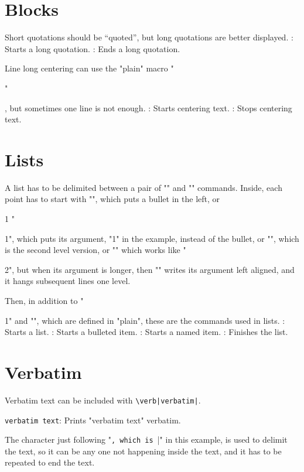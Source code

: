 \section{Blocks}

Short quotations should be “quoted”,
but long quotations are better displayed.
\command\begincitation: Starts a long quotation.
\command\endcitation: Ends a long quotation.

Line long centering can use the
"plain" macro "\centerline",
but sometimes one line is not enough.
\command\begincenter: Starts centering text.
\command\endcenter: Stops centering text.


\section{Lists}

A list has to be delimited between a pair of
"\beginpoints" and "\endpoints" commands.
Inside, each point has to start with
\beginpoints
\point "\point", which puts a bullet in the left, or
 \item{1} "\item{1}", which puts its argument, "1" in the example,
 instead of the bullet, or
  "", which is the second level
 version, or
\point[2] "\point[2]" which works like "\item{2}", but
 when its argument is longer, then
 "" writes its
 argument left aligned, and it hangs subsequent lines
 one level.
\endpoints

Then, in addition to "\item{1}" and "",
which are defined in "plain",
these are the commands used in lists.
\command\beginpoints: Starts a list.
\command\point: Starts a bulleted item.
\command\point[Title]: Starts a named item.
\command\endpoints: Finishes the list.


\section{Verbatim}

Verbatim text can be included with \verb!\verb|verbatim|!.

\command\verb|verbatim text|: Prints "verbatim text" verbatim.

The character just following "\verb", which is "|" in this example,
is used to delimit the text, so it can be any one not happening
inside the text, and it has to be repeated to end the text.

